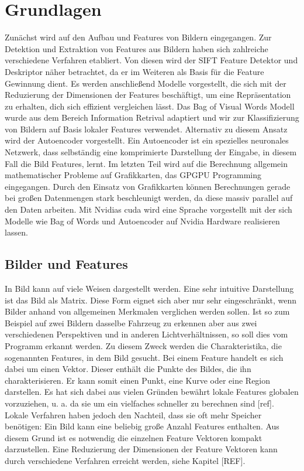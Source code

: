 \chapter{Grundlagen}

Zunächst wird auf den Aufbau und Features von Bildern eingegangen. Zur Detektion und Extraktion von Features aus Bildern haben sich zahlreiche verschiedene Verfahren etabliert. Von diesen wird der SIFT Feature Detektor und Deskriptor näher betrachtet, da er im Weiteren als Basis für die Feature Gewinnung dient. Es werden anschließend Modelle vorgestellt, die sich mit der Reduzierung der Dimensionen der Features beschäftigt, um eine Repräsentation zu erhalten, dich sich effizient vergleichen lässt. Das Bag of Visual Words Modell wurde aus dem Bereich Information Retrival adaptiert und wir zur Klassifizierung von Bildern auf Basis lokaler Features verwendet. Alternativ zu diesem Ansatz wird der Autoencoder vorgestellt. Ein Autoencoder ist ein spezielles neuronales Netzwerk, dass selbständig eine komprimierte Darstellung der Eingabe, in diesem Fall die Bild Features, lernt. Im letzten Teil wird auf die Berechnung allgemein mathematischer Probleme auf Grafikkarten, das GPGPU Programming eingegangen. Durch den Einsatz von Grafikkarten können Berechnungen gerade bei großen Datenmengen stark beschleunigt werden, da diese massiv parallel auf den Daten arbeiten. Mit Nvidias cuda wird eine Sprache vorgestellt mit der sich Modelle wie Bag of Words und Autoencoder auf Nvidia Hardware realisieren lassen.

\section{Bilder und Features}

In Bild kann auf viele Weisen dargestellt werden. Eine sehr intuitive Darstellung ist das Bild als Matrix. Diese Form eignet sich aber nur sehr eingeschränkt, wenn Bilder anhand von allgemeinen Merkmalen verglichen werden sollen. Ist so zum Beispiel auf zwei Bildern dasselbe Fahrzeug zu erkennen aber aus zwei verschiedenen Perspektiven und in anderen Lichtverhältnissen, so soll dies vom Programm erkannt werden. Zu diesem Zweck werden die Charakteristika, die sogenannten Features, in dem Bild gesucht. Bei einem Feature handelt es sich dabei um einen Vektor. Dieser enthält die Punkte des Bildes, die ihn charakterisieren. Er kann somit einen Punkt, eine Kurve oder eine Region darstellen. Es hat sich dabei aus vielen Gründen bewährt lokale Features globalen vorzuziehen, u. a. da sie um ein vielfaches schneller zu berechnen sind [ref]. Lokale Verfahren haben jedoch den Nachteil, dass sie oft mehr Speicher benötigen: Ein Bild kann eine beliebig große Anzahl Features enthalten. Aus diesem Grund ist es notwendig die einzelnen Feature Vektoren kompakt darzustellen. Eine Reduzierung der Dimensionen der Feature Vektoren kann durch verschiedene Verfahren erreicht werden, siehe Kapitel [REF].

